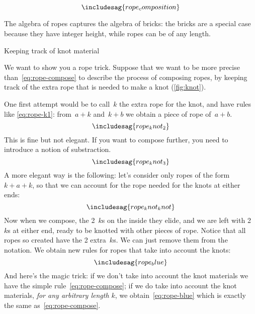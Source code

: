 \begin{equation*}\label{eq:rope-compose}
\includesag{rope_composition}
\end{equation*}

The algebra of ropes captures the algebra of bricks: the bricks are a special case because they have integer height, while ropes can be of any length.
\begin{marginfigure}
  \caption{Keeping track of knot material}\label{fig:knot}
\end{marginfigure}


We want to show you a rope trick.
Suppose that we want to be more precise than~\cref{eq:rope-compose} to describe the process of composing ropes, by keeping track of the extra rope that is needed to make a knot (\cref{fig:knot}).


One first attempt would be to call~$k$ the extra rope for the knot, and have rules like \cref{eq:rope-k1}: from~$a + k$ and~$k + b$ we obtain a piece of rope of~$a+b$.
%
\begin{equation}\label{eq:rope-k1}
\includesag{rope_knot_2}
\end{equation}
%
This is fine but not elegant.
If you want to compose further, you need to introduce a notion of substraction.
%
\begin{equation}\label{eq:rope-k2}
\includesag{rope_knot_3}
\end{equation}
%
A more elegant way is the following: let's consider only ropes of the form~$k + a + k$, so that we can account for the rope needed for the knots at either ends:
%
\begin{equation}\label{eq:rope-kk}
\includesag{rope_knot_knot}
\end{equation}
%
Now when we compose, the 2~$k$s on the inside they elide, and we are left with 2~$k$s at either end, ready to be knotted with other pieces of rope.
Notice that all ropes so created have the 2 extra~$k$s.
We can just remove them from the notation. We obtain new rules for ropes that take into account the knots:
%
\begin{equation*}\label{eq:rope-blue}
\includesag{rope_blue}
  \end{equation*}
%
And here's the magic trick: if we don't take into account the knot materials we have the simple rule~\cref{eq:rope-compose}; if we do take into account the knot materials, \emph{for any arbitrary length $k$}, we obtain~\cref{eq:rope-blue} which is exactly the same as~\cref{eq:rope-compose}.

